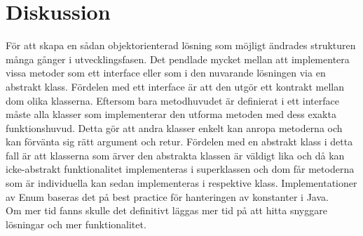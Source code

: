 \documentclass{article}
\begin{document}
\section{Diskussion}
För att skapa en sådan objektorienterad lösning som möjligt ändrades strukturen många gånger i utvecklingsfasen.
Det pendlade mycket mellan att implementera vissa metoder som ett interface eller som i den nuvarande lösningen via en abstrakt klass.
Fördelen med ett interface är att den utgör ett kontrakt mellan dom olika klasserna. Eftersom bara metodhuvudet är definierat i ett interface måste
alla klasser som implementerar den utforma metoden med dess exakta funktionshuvud. Detta gör att andra klasser enkelt kan anropa metoderna och kan förvänta sig rätt argument och retur.
Fördelen med en abstrakt klass i detta fall är att klasserna som ärver den abstrakta klassen är väldigt lika och då kan icke-abstrakt funktionalitet implementeras i superklassen och dom får metoderna som är individuella kan sedan implementeras i respektive klass.
Implementationer av Enum baseras det på best practice för hanteringen av konstanter i Java.
\\
Om mer tid fanns skulle det definitivt läggas mer tid på att hitta snyggare lösningar och mer funktionalitet. 
\end{document}
